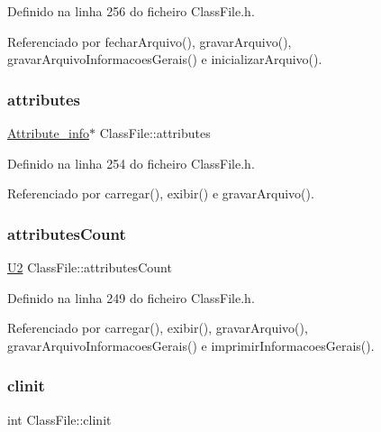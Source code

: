 Definido na linha 256 do ficheiro Class\+File.\+h.



Referenciado por fechar\+Arquivo(), gravar\+Arquivo(), gravar\+Arquivo\+Informacoes\+Gerais() e inicializar\+Arquivo().

\mbox{\label{classClassFile_a20d4b18030becbd8df5b7584477e94b6}} 
\subsubsection{\texorpdfstring{attributes}{attributes}}
{\footnotesize\ttfamily \hyperlink{structAttribute__info}{Attribute\+\_\+info}$\ast$ Class\+File\+::attributes\hspace{0.3cm}{\ttfamily [private]}}



Definido na linha 254 do ficheiro Class\+File.\+h.



Referenciado por carregar(), exibir() e gravar\+Arquivo().

\mbox{\label{classClassFile_a66691e77df3f8604eebebc8759953542}} 
\subsubsection{\texorpdfstring{attributes\+Count}{attributesCount}}
{\footnotesize\ttfamily \hyperlink{BasicTypes_8h_a90240657108b1b457eef9d3f76e0202e}{U2} Class\+File\+::attributes\+Count\hspace{0.3cm}{\ttfamily [private]}}



Definido na linha 249 do ficheiro Class\+File.\+h.



Referenciado por carregar(), exibir(), gravar\+Arquivo(), gravar\+Arquivo\+Informacoes\+Gerais() e imprimir\+Informacoes\+Gerais().

\mbox{\label{classClassFile_aa1eb77ebbd737bde7edde5fbdb2b6992}} 
\subsubsection{\texorpdfstring{clinit}{clinit}}
{\footnotesize\ttfamily int Class\+File\+::clinit\hspace{0.3cm}{\ttfamily [private]}}



